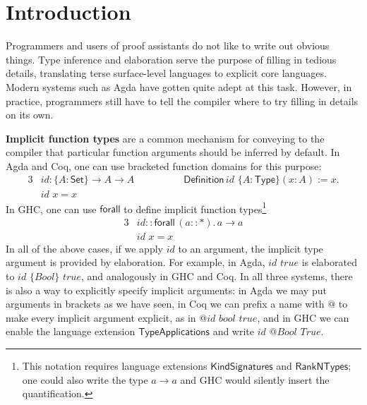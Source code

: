 \documentclass[acmsmall,review,anonymous,prologue,dvipsnames]{acmart}\settopmatter{printfolios=true,printccs=false,printacmref=false}
\newcommand{\kw}[1]{{\mathsf{#1}}}
\newcommand{\mi}[1]{\mathit{#1}}
\theoremstyle{remark}
\begin{document}

\maketitle




\section{Introduction}
\label{sec:introduction}

Programmers and users of proof assistants do not like to write out obvious
things. Type inference and elaboration serve the purpose of filling in tedious
details, translating terse surface-level languages to explicit core
languages. Modern systems such as Agda have gotten quite adept at this
task. However, in practice, programmers still have to tell the compiler where to
try filling in details on its own.

\textbf{Implicit function types} are a common mechanism for conveying to the
compiler that particular function arguments should be inferred by default. In
Agda and Coq, one can use bracketed function domains for this purpose:
\begin{alignat*}{3}
  & \mi{id} : \{A : \kw{Set}\}\to A \to A \hspace{5em} \kw{Definition}\,\mi{id}\,\,\{A : \kw{Type}\}(x : A) := x.\\
  & \mi{id}\,\,x = x
\end{alignat*}
In GHC, one can use $\kw{forall}$ to define implicit function
types\footnote{This notation requires language extensions
  $\mathsf{KindSignatures}$ and $\mathsf{RankNTypes}$; one could also write the type
  $a \to a$ and GHC would silently insert the quantification.}
\begin{alignat*}{3}
  & \mi{id} :: \kw{forall}\,(a :: \kw{*}).\,a \to a\\
  & \mi{id}\,\,x = x
\end{alignat*}
In all of the above cases, if we apply $id$ to an argument, the implicit type
argument is provided by elaboration. For example, in Agda, $\mi{id}\,\,\mi{true}$ is
elaborated to $\mi{id}\,\,\{\mi{Bool}\}\,\,\mi{true}$, and analogously in GHC and Coq. In all three
systems, there is also a way to explicitly specify implicit arguments: in Agda
we may put arguments in brackets as we have seen, in Coq we can prefix a name
with $\kw{@}$ to make every implicit argument explicit, as in
$\kw{@}\mi{id}\,\,\mi{bool}\,\,\mi{true}$, and in GHC we can enable the language extension
$\mathsf{TypeApplications}$ \cite{eisenberg2016visible} and write
$\mi{id}\,\,\kw{@}\mi{Bool}\,\,\mi{True}$.
\end{document}
